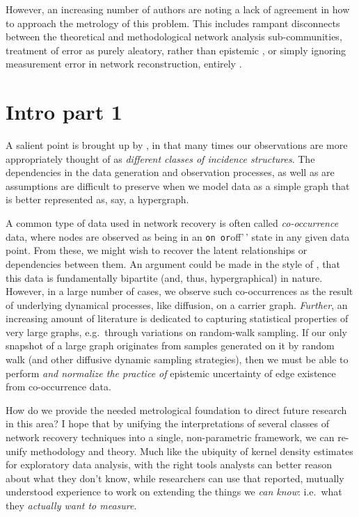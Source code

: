 \documentclass[%
	12pt,
		oneside,
		letterpaper
]{book}
\begin{document}
However, an increasing number of authors are noting a lack of agreement
in how to approach the metrology of this problem. This includes rampant
disconnects between the theoretical and methodological network analysis
sub-communities\autocite{Statisticalinferencelinks_Peel2022}, treatment
of error as purely aleatory, rather than epistemic
\autocite{Measurementerrornetwork_Wang2012}, or simply ignoring
measurement error in network reconstruction, entirely
\autocite{ReconstructingNetworksUnknown_Peixoto2018}.

\section*{Intro part 1}\label{intro-part-1}


A salient point is brought up by \textcite{WhyHowWhen_Torres2021}, in
that many times our observations are more appropriately thought of as
\emph{different classes of incidence
structures}.\autocite{WhyHowWhen_Torres2021} The dependencies in the
data generation and observation processes, as well as are assumptions
are difficult to preserve when we model data as a simple graph that is
better represented as, say, a hypergraph.

A common type of data used in network recovery is often called
\emph{co-occurrence} data, where nodes are observed as being in an
\texttt{on\textquotesingle{}\textquotesingle{}\ or}off'\,' state in any
given data point. From these, we might wish to recover the latent
relationships or dependencies between them. An argument could be made in
the style of \textcite{WhyHowWhen_Torres2021}, that this data is
fundamentally bipartite (and, thus, hypergraphical) in nature. However,
in a large number of cases, we observe such co-occurrences as the result
of underlying dynamical processes, like diffusion, on a carrier graph.
\emph{Further}, an increasing amount of literature is dedicated to
capturing statistical properties of very large graphs, e.g.~through
variations on random-walk sampling. If our only snapshot of a large
graph originates from samples generated on it by random walk (and other
diffusive dynamic sampling strategies), then we must be able to perform
\emph{and normalize the practice of} epistemic uncertainty of edge
existence from co-occurrence data.

How do we provide the needed metrological foundation to direct future
research in this area? I hope that by unifying the interpretations of
several classes of network recovery techniques into a single,
non-parametric framework, we can re-unify methodology and theory. Much
like the ubiquity of kernel density estimates for exploratory data
analysis, with the right tools analysts can better reason about what
they don't know, while researchers can use that reported, mutually
understood experience to work on extending the things we \emph{can
know}: i.e.~what they \emph{actually want to measure}.
\end{document}
